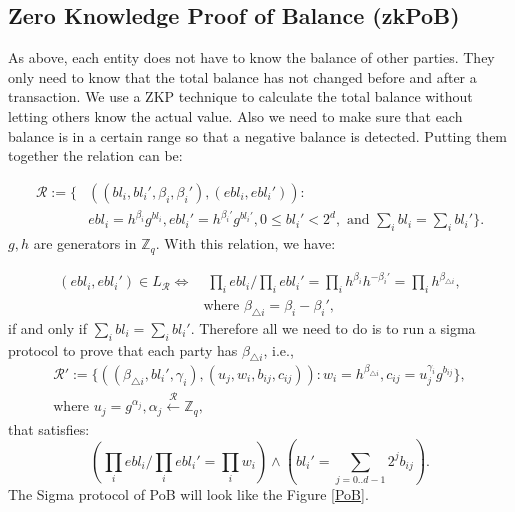 \documentclass[10pt,fleqn]{article}
\begin{document}
\subsection{Zero Knowledge Proof of Balance (zkPoB)}
As above, each entity does not have to know the balance of other parties. They only need to know that the total balance has not changed before and after a transaction.  We use a ZKP technique to calculate the total balance without letting others know the actual value. Also we need to make sure that each balance is in a certain range so that a negative balance is detected. Putting them together the relation can be:

\[ \begin{split}
\mathcal{R} := \{& ((bl_i, bl_i', \beta_i, \beta_i'), (ebl_i, ebl_i')) : \\
& ebl_i = h^{\beta_i}g^{bl_i}, ebl_i' = h^{\beta_i'}g^{bl_i'}, 0 \le bl_i' < 2^d, \text{ and } \sum_i bl_i = \sum_i bl_i' \}.
\end{split} \]
$g, h$ are generators in $\mathbb{Z}_q$. With this relation, we have:

\[ \begin{split}
(ebl_i, ebl_i') \in L_{\mathcal{R}} \Longleftrightarrow & \; \prod_i ebl_i / \prod_i ebl_i' = \prod_i h^{\beta_i} h^{-\beta_i'} = \prod_i h^{\beta_{\triangle i}}, \\ 
  & \text{where } \beta_{\triangle i} = \beta_i - \beta_i',
\end{split} \]
if and only if $\sum_i bl_i = \sum_i bl_i'$. Therefore all we need to do is to run a sigma protocol to prove that each party has $\beta_{\triangle i}$, i.e.,
\[ \begin{split}
\mathcal{R}' := \{ ((\beta_{\triangle i}, bl_i', \gamma_i), (u_j, w_i, b_{ij}, c_{ij})) : w_i = h^{\beta_{\triangle i}}, c_{ij} = u_j^{\gamma_i} g^{b_{ij}} \}, \\
\text{where } u_j = g^{\alpha_j}, \alpha_j \xleftarrow{\mathcal{R}} \mathbb{Z}_q,
\end{split} \]
that satisfies:
\[
(\prod_i ebl_i / \prod_i ebl_i' = \prod_i w_i) \wedge (bl_i' = \sum_{j = 0..d-1} 2^{j} b_{ij}).
\]
The Sigma protocol of PoB will look like the Figure \ref{PoB}.
\end{document}
